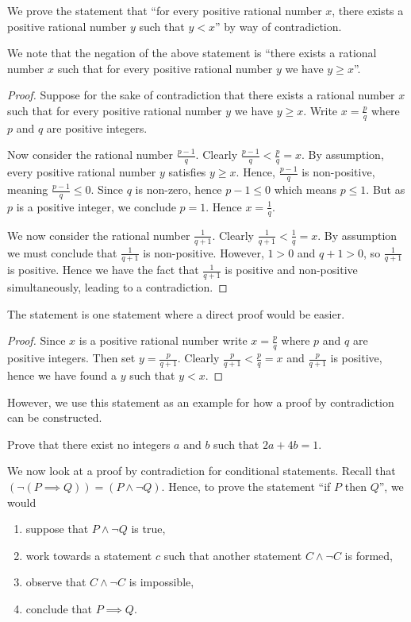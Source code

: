 \begin{example}
    We prove the statement that ``for every positive rational number $x$, there exists a positive rational number $y$ such that $y < x$'' by way of contradiction.
    
    We note that the negation of the above statement is ``there exists a rational number $x$ such that for every positive rational number $y$ we have $y \geq x$''.
    \begin{proof}
        Suppose for the sake of contradiction that there exists a rational number $x$ such that for every positive rational number $y$ we have $y \geq x$. Write $x = \frac pq$ where $p$ and $q$ are positive integers.
        
        Now consider the rational number $\frac{p-1}{q}$. Clearly $\frac{p-1}{q} < \frac pq = x$. By assumption, every positive rational number $y$ satisfies $y \geq x$. Hence, $\frac{p-1}{q}$ is non-positive, meaning $\frac{p-1}{q} \leq 0$. Since $q$ is non-zero, hence $p - 1 \leq 0$ which means $p \leq 1$. But as $p$ is a positive integer, we conclude $p = 1$. Hence $x = \frac 1q$.
        
        We now consider the rational number $\frac{1}{q+1}$. Clearly $\frac{1}{q+1} < \frac{1}{q} = x$. By assumption we must conclude that $\frac{1}{q+1}$ is non-positive. However, $1 > 0$ and $q + 1 > 0$, so $\frac{1}{q+1}$ is positive. Hence we have the fact that $\frac{1}{q+1}$ is positive and non-positive simultaneously, leading to a contradiction.
    \end{proof}
\end{example}
\begin{remark}
    The statement is one statement where a direct proof would be easier.
    \begin{proof}
        Since $x$ is a positive rational number write $x = \frac pq$ where $p$ and $q$ are positive integers. Then set $y = \frac{p}{q+1}$. Clearly $\frac{p}{q+1} < \frac{p}{q} = x$ and $\frac{p}{q+1}$ is positive, hence we have found a $y$ such that $y < x$.
    \end{proof}
    However, we use this statement as an example for how a proof by contradiction can be constructed.
\end{remark}

\begin{exercise}
    Prove that there exist no integers $a$ and $b$ such that $2a + 4b = 1$.
\end{exercise}

We now look at a proof by contradiction for conditional statements. Recall that $(\lnot(P \implies Q)) = (P \land \lnot Q)$. Hence, to prove the statement ``if $P$ then $Q$'', we would
\begin{enumerate}
    \item suppose that $P \land \lnot Q$ is true,
    \item work towards a statement $c$ such that another statement $C \land \lnot C$ is formed,
    \item observe that $C \land \lnot C$ is impossible,
    \item conclude that $P \implies Q$.
\end{enumerate}

